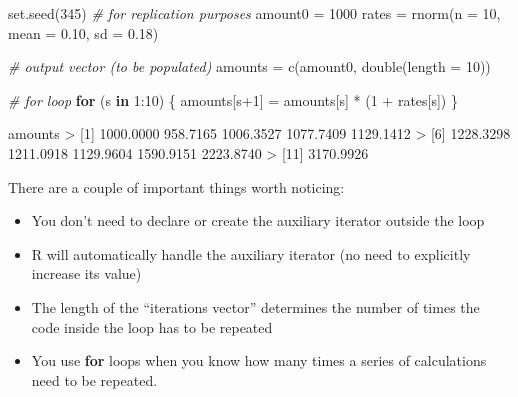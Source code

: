 \documentclass[
]{book}
\newenvironment{Shaded}{\begin{snugshade}}{\end{snugshade}}
\newcommand{\AttributeTok}[1]{\textcolor[rgb]{0.77,0.63,0.00}{#1}}
\newcommand{\CommentTok}[1]{\textcolor[rgb]{0.56,0.35,0.01}{\textit{#1}}}
\newcommand{\ControlFlowTok}[1]{\textcolor[rgb]{0.13,0.29,0.53}{\textbf{#1}}}
\newcommand{\DecValTok}[1]{\textcolor[rgb]{0.00,0.00,0.81}{#1}}
\newcommand{\FloatTok}[1]{\textcolor[rgb]{0.00,0.00,0.81}{#1}}
\newcommand{\FunctionTok}[1]{\textcolor[rgb]{0.00,0.00,0.00}{#1}}
\newcommand{\NormalTok}[1]{#1}
\newcommand{\OtherTok}[1]{\textcolor[rgb]{0.56,0.35,0.01}{#1}}
\newcommand{\SpecialCharTok}[1]{\textcolor[rgb]{0.00,0.00,0.00}{#1}}
\begin{document}
\begin{Shaded}
\begin{Highlighting}[]
\FunctionTok{set.seed}\NormalTok{(}\DecValTok{345}\NormalTok{)    }\CommentTok{\# for replication purposes}
\NormalTok{amount0 }\OtherTok{=} \DecValTok{1000}
\NormalTok{rates }\OtherTok{=} \FunctionTok{rnorm}\NormalTok{(}\AttributeTok{n =} \DecValTok{10}\NormalTok{, }\AttributeTok{mean =} \FloatTok{0.10}\NormalTok{, }\AttributeTok{sd =} \FloatTok{0.18}\NormalTok{)}

\CommentTok{\# output vector (to be populated)}
\NormalTok{amounts }\OtherTok{=} \FunctionTok{c}\NormalTok{(amount0, }\FunctionTok{double}\NormalTok{(}\AttributeTok{length =} \DecValTok{10}\NormalTok{))}

\CommentTok{\# for loop}
\ControlFlowTok{for}\NormalTok{ (s }\ControlFlowTok{in} \DecValTok{1}\SpecialCharTok{:}\DecValTok{10}\NormalTok{) \{}
\NormalTok{  amounts[s}\SpecialCharTok{+}\DecValTok{1}\NormalTok{] }\OtherTok{=}\NormalTok{ amounts[s] }\SpecialCharTok{*}\NormalTok{ (}\DecValTok{1} \SpecialCharTok{+}\NormalTok{ rates[s])}
\NormalTok{\}}

\NormalTok{amounts}
\SpecialCharTok{\textgreater{}}\NormalTok{  [}\DecValTok{1}\NormalTok{] }\FloatTok{1000.0000}  \FloatTok{958.7165} \FloatTok{1006.3527} \FloatTok{1077.7409} \FloatTok{1129.1412}
\SpecialCharTok{\textgreater{}}\NormalTok{  [}\DecValTok{6}\NormalTok{] }\FloatTok{1228.3298} \FloatTok{1211.0918} \FloatTok{1129.9604} \FloatTok{1590.9151} \FloatTok{2223.8740}
\SpecialCharTok{\textgreater{}}\NormalTok{ [}\DecValTok{11}\NormalTok{] }\FloatTok{3170.9926}
\end{Highlighting}
\end{Shaded}

There are a couple of important things worth noticing:

\begin{itemize}
\item
  You don't need to declare or create the auxiliary iterator outside the loop
\item
  R will automatically handle the auxiliary iterator (no need to explicitly
  increase its value)
\item
  The length of the ``iterations vector'' determines the number of times the code
  inside the loop has to be repeated
\item
  You use \textbf{for} loops when you know how many times a series of calculations
  need to be repeated.
\end{itemize}
\end{document}

